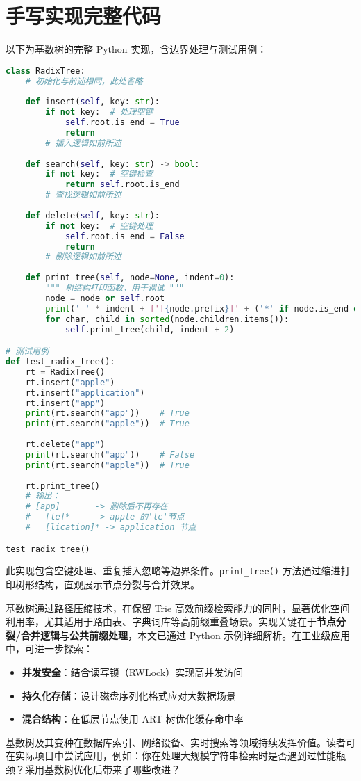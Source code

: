 \chapter{手写实现完整代码}
以下为基数树的完整 Python 实现，含边界处理与测试用例：\par
\begin{lstlisting}[language=python]
class RadixTree:
    # 初始化与前述相同，此处省略
    
    def insert(self, key: str):
        if not key:  # 处理空键
            self.root.is_end = True
            return
        # 插入逻辑如前所述
        
    def search(self, key: str) -> bool:
        if not key:  # 空键检查
            return self.root.is_end
        # 查找逻辑如前所述
        
    def delete(self, key: str):
        if not key:  # 空键处理
            self.root.is_end = False
            return
        # 删除逻辑如前所述
        
    def print_tree(self, node=None, indent=0):
        """ 树结构打印函数，用于调试 """
        node = node or self.root
        print(' ' * indent + f'[{node.prefix}]' + ('*' if node.is_end else ''))
        for char, child in sorted(node.children.items()):
            self.print_tree(child, indent + 2)

# 测试用例
def test_radix_tree():
    rt = RadixTree()
    rt.insert("apple")
    rt.insert("application")
    rt.insert("app")
    print(rt.search("app"))    # True
    print(rt.search("apple"))  # True
    
    rt.delete("app")
    print(rt.search("app"))    # False
    print(rt.search("apple"))  # True
    
    rt.print_tree()
    # 输出：
    # [app]       -> 删除后不再存在
    #   [le]*     -> apple 的'le'节点
    #   [lication]* -> application 节点

test_radix_tree()
\end{lstlisting}
此实现包含空键处理、重复插入忽略等边界条件。\texttt{print\_{}tree()} 方法通过缩进打印树形结构，直观展示节点分裂与合并效果。\par
基数树通过路径压缩技术，在保留 Trie 高效前缀检索能力的同时，显著优化空间利用率，尤其适用于路由表、字典词库等高前缀重叠场景。实现关键在于\textbf{节点分裂/合并逻辑}与\textbf{公共前缀处理}，本文已通过 Python 示例详细解析。在工业级应用中，可进一步探索：\par
\begin{itemize}
\item \textbf{并发安全}：结合读写锁（RWLock）实现高并发访问
\item \textbf{持久化存储}：设计磁盘序列化格式应对大数据场景
\item \textbf{混合结构}：在低层节点使用 ART 树优化缓存命中率
\end{itemize}
基数树及其变种在数据库索引、网络设备、实时搜索等领域持续发挥价值。读者可在实际项目中尝试应用，例如：你在处理大规模字符串检索时是否遇到过性能瓶颈？采用基数树优化后带来了哪些改进？\par
